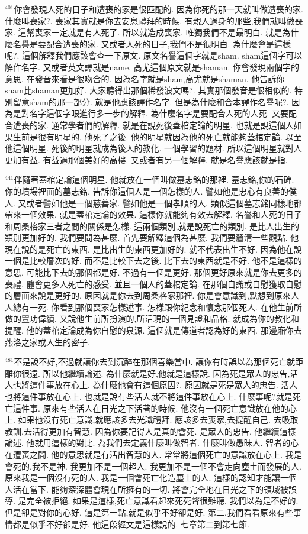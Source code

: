 \documentclass{book}
\begin{document}
$^{401}$你會發現人死的日子和遭喪的家是很匹配的.
因為你死的那一天就叫做遭喪的家.
什麼叫喪家?.
喪家其實就是你去安息禮拜的時候.
有親人過身的那些,我們就叫做喪家.
這幫喪家一定就是有人死了.
所以就造成喪家.
唯獨我們不是最明白.
就是為什麼名譽是要配合遭喪的家.
又或者人死的日子,我們不是很明白.
為什麼會是這樣呢?.
這個解釋我們應該會查一下原文.
原文名譽這個字就是sham.
sham這個字可以解作名字.
又或者英文譯就是name.
高尤這個原文就是shaman.
你會發現兩個字的意思.
在發音來看是很吻合的.
因為名字就是sham,高尤就是shaman.
他告訴你sham比shaman更加好.
大家聽得出那個稀發浪文嗎?.
其實那個發音是很相似的.
特別留意sham的那一部分.
就是他應該譯作名字.
但是為什麼和合本譯作名譽呢?.
因為是對名字這個字眼進行多一步的解釋.
為什麼名字是要配合人死的人死.
又要配合遭喪的家.
通常學者們的解釋.
就是在說死後蓋棺定論的明星.
也就是說這個人如果生前是很有明星的.
他死了之後.
他的明星就因為他的死亡就能夠蓋棺定論.
以至他這個明星.
死後的明星就成為後人的教化.
一個學習的題材.
所以這個明星就對人更加有益.
有益過那個美好的高樓.
又或者有另一個解釋.
就是名譽應該就是指.

$^{441}$伴隨著蓋棺定論這個明星.
他就放在一個叫做墓志銘的那裡.
墓志銘,你的石碑.
你的墳場裡面的墓志銘.
告訴你這個人是一個怎樣的人.
譬如他是忠心有良善的僕人.
又或者譬如他是一個慈善家.
譬如他是一個孝順的人.
類似這個墓志銘同樣地都帶來一個效果.
就是蓋棺定論的效果.
這樣你就能夠有效去解釋.
名譽和人死的日子和周桑格家三者之間的關係是怎樣.
這兩個類別,就是說死亡的類別.
是比人出生的類別更加好的.
我們要問為甚麼.
首先要解釋這個為甚麼.
我們要釐清一些觀點.
他現在說的是死亡的東西.
是比出生的東西更加好的.
就不代表出生不好.
因為他在說一個是比較層次的好.
而不是比較下去之後.
比下去的東西就是不好.
他不是這樣的意思.
可能比下去的那個都是好.
不過有一個是更好.
那個更好原來就是你去更多的喪禮.
體會更多人死亡的感受.
並且一個人的蓋棺定論.
在那個自識或自慰獲取自慰的層面來說是更好的.
原因就是你去到周桑格家那裡.
你是會意識到,默想到原來人人總有一死.
你看到那個喪家怎樣述事.
怎樣跟你紀念和懷念那個死人.
在他生前所做的豐功偉績.
又說他生前所扮演的,所活現的一個見證和品格.
就成為你的教化和提醒.
他的蓋棺定論成為你自慰的泉源.
這個就是傳道者認為好的東西.
那邊廂你去燕洛之家或人生的密子.

$^{481}$不是說不好,不過就讓你去到沉醉在那個喜樂當中.
讓你有時誤以為那個死亡就距離你很遠.
所以他繼續論述.
為什麼就是好,他就是這樣說.
因為死是眾人的忠告,活人也將這件事放在心上.
為什麼他會有這個原因?.
原因就是死是眾人的忠告.
活人也將這件事放在心上.
也就是說有些活人就不將這件事放在心上.
什麼事呢?就是死亡這件事.
原來有些活人在日光之下活著的時候.
他沒有一個死亡意識放在他的心上.
如果他沒有死亡意識,就應該多去光識禮拜.
應該多去喪家,去提醒自己.
去吸取教訓,去活得更加有智慧.
因為你要記得人是真的會死.
是眾人的忠告.
他繼續這樣論述.
他就用這樣的對比.
為我們去定義什麼叫做智者.
什麼叫做愚昧人.
智者的心在遭喪之間.
他的意思就是有活出智慧的人.
常常將這個死亡的意識放在心上.
我是會死的,我不是神.
我更加不是一個超人.
我更加不是一個不會走向塵土而發展的人.
原來我是一個沒有死的人.
我是一個會死亡化造塵土的人.
這樣的認知才能讓一個人活在當下.
能夠深深體會現在所擁有的一切.
將會完全地在日光之下的領域被誤導.
是完全被拒絕.
如果是這樣,死亡意識看起來死死聲很難聽.
我們以為是不好的.
但是卻是對你的心好.
這是第一點,就是似乎不好卻是好.
第二,我們看看原來有些事情都是似乎不好卻是好.
他這段經文是這樣說的.
七章第二到第七節.
\end{document}
